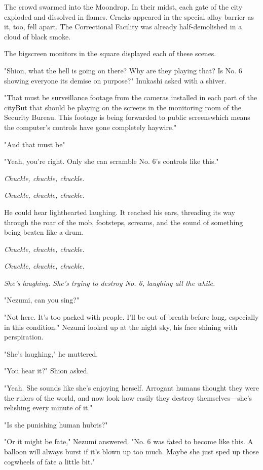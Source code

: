 The crowd swarmed into the Moondrop. In their midst, each gate of the
city exploded and dissolved in flames. Cracks appeared in the special
alloy barrier as it, too, fell apart. The Correctional Facility was
already half-demolished in a cloud of black smoke.

The bigscreen monitors in the square displayed each of these scenes.

"Shion, what the hell is going on there? Why are they playing that? Is
No. 6 showing everyone its demise on purpose?" Inukashi asked with a
shiver.

"That must be surveillance footage from the cameras installed in each
part of the city\el But that should be playing on the screens in the
monitoring room of the Security Bureau. This footage is being forwarded
to public screens\el which means the computer's controls have gone
completely haywire."

"And that must be\el "

"Yeah, you're right. Only she can scramble No. 6's controls like this."

\emph{Chuckle, chuckle, chuckle.}

\emph{Chuckle, chuckle, chuckle.}

He could hear lighthearted laughing. It reached his ears, threading its
way through the roar of the mob, footsteps, screams, and the sound of
something being beaten like a drum.

\emph{Chuckle, chuckle, chuckle.}

\emph{Chuckle, chuckle, chuckle.}

\myspace

\emph{She's laughing. She's trying to destroy No. 6, laughing all the while.}

"Nezumi, can you sing?"

"\el Not here. It's too packed with people. I'll be out of breath before
long, especially in this condition." Nezumi looked up at the night sky,
his face shining with perspiration.

"She's laughing," he muttered.

"You hear it?" Shion asked.

"Yeah. She sounds like she's enjoying herself. Arrogant humans thought
they were the rulers of the world, and now look how easily they destroy
themselves---she's relishing every minute of it."

"Is she punishing human hubris?"

"Or it might be fate," Nezumi answered. "No. 6 was fated to become like
this. A balloon will always burst if it's blown up too much. Maybe she
just sped up those cogwheels of fate a little bit."

